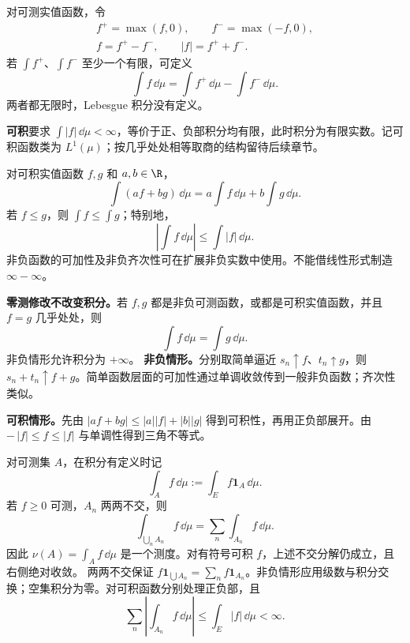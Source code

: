 对可测实值函数，令
\[
\begin{gathered}
f^+=\max(f,0),\qquad f^-=\max(-f,0),\\
f=f^+-f^-,\qquad |f|=f^++f^-.
\end{gathered}
\]
若 $\int f^+$、$\int f^-$ 至少一个有限，可定义
\[
\int f\,\dd\mu=\int f^+\,\dd\mu-\int f^-\,\dd\mu.
\]
两者都无限时，Lebesgue 积分没有定义。

\textbf{可积}要求 $\int|f|\,\dd\mu<\infty$，等价于正、负部积分均有限，此时积分为有限实数。记可积函数类为 $L^1(\mu)$；按几乎处处相等取商的结构留待后续章节。

对可积实值函数 $f,g$ 和 $a,b\in\R$，
\[
\int(af+bg)\,\dd\mu
=a\int f\,\dd\mu+b\int g\,\dd\mu.
\]
若 $f\le g$，则 $\int f\le\int g$；特别地，
\[
\left|\int f\,\dd\mu\right|\le\int|f|\,\dd\mu.
\]
非负函数的可加性及非负齐次性可在扩展非负实数中使用。不能借线性形式制造 $\infty-\infty$。

\textbf{零测修改不改变积分。}若 $f,g$ 都是非负可测函数，或都是可积实值函数，并且 $f=g$ 几乎处处，则
\[
\int f\,\dd\mu=\int g\,\dd\mu.
\]
非负情形允许积分为 $+\infty$。
\textbf{非负情形。}分别取简单逼近 $s_n\uparrow f$、$t_n\uparrow g$，则 $s_n+t_n\uparrow f+g$。简单函数层面的可加性通过单调收敛传到一般非负函数；齐次性类似。

\textbf{可积情形。}先由 $|af+bg|\le|a||f|+|b||g|$ 得到可积性，再用正负部展开。由 $-\,|f|\le f\le|f|$ 与单调性得到三角不等式。

对可测集 $A$，在积分有定义时记
\[
\int_A f\,\dd\mu:=\int_E f\mathbf1_A\,\dd\mu.
\]
若 $f\ge0$ 可测，$A_n$ 两两不交，则
\[
\int_{\bigcup_n A_n}f\,\dd\mu
=\sum_n\int_{A_n}f\,\dd\mu.
\]
因此 $\nu(A)=\int_A f\,\dd\mu$ 是一个测度。对有符号可积 $f$，上述不交分解仍成立，且右侧绝对收敛。
两两不交保证 $f\mathbf1_{\bigcup A_n}=\sum_n f\mathbf1_{A_n}$。非负情形应用级数与积分交换；空集积分为零。对可积函数分别处理正负部，且
\[
\sum_n\left|\int_{A_n}f\,\dd\mu\right|
\le\int_E|f|\,\dd\mu<\infty.
\]

